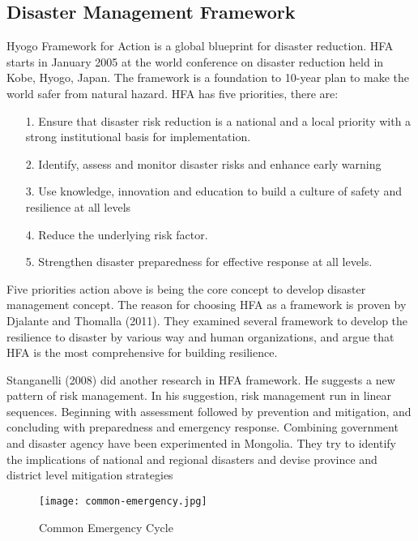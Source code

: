 \subsection{Disaster Management Framework}
Hyogo Framework for Action is a global blueprint for disaster reduction. HFA starts in January 2005 at the world conference on disaster reduction held in Kobe, Hyogo, Japan. The framework is a foundation to 10-year plan to make the world safer from natural hazard. HFA has five priorities, there are\cite{HFAConference}:
\begin{enumerate}
\setlength{\itemsep}{1.5pt}
\setlength{\parskip}{1.5pt}
\item[1.]Ensure that disaster risk reduction is a national and a local priority with a strong institutional basis for implementation.
\item[2.]Identify, assess and monitor disaster risks and enhance early  warning
\item[3.]Use knowledge, innovation and education to build a culture of  safety and resilience at all levels
\item[4.]Reduce the underlying risk factor.
\item[5.]Strengthen disaster preparedness for effective response at all levels.
\end{enumerate}\par
Five priorities action above is being the core concept to develop disaster management concept. The reason for choosing HFA as a framework is proven by Djalante and Thomalla (2011). They examined several framework to develop the resilience to disaster by various way and human organizations, and argue that HFA is the most comprehensive for building resilience.\par
Stanganelli (2008) did another research in HFA framework. He suggests a new pattern of risk management. In his suggestion, risk management run in linear sequences. Beginning with assessment followed by prevention and mitigation, and concluding with preparedness and emergency response\cite{PatternRiskManagment}. Combining government and disaster agency have been experimented in Mongolia\cite{EffisientDM}. They try to identify the implications of national and regional disasters and devise province and district level mitigation strategies\par

\begin{figure}[H]
\begin{center}
\texttt{[image: common-emergency.jpg]}
\caption{Common Emergency Cycle\cite{CommonEmg}}
\label{fig:emg-cycle}
\end{center}
\end{figure}\par


